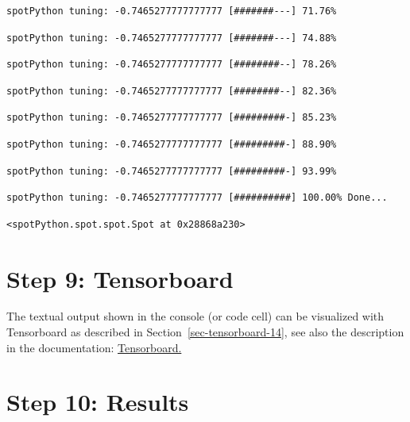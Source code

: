 \documentclass[
  letterpaper,
  DIV=11,
  numbers=noendperiod]{scrreprt}
\begin{document}
\begin{verbatim}
spotPython tuning: -0.7465277777777777 [#######---] 71.76% 
\end{verbatim}

\begin{verbatim}
spotPython tuning: -0.7465277777777777 [#######---] 74.88% 
\end{verbatim}

\begin{verbatim}
spotPython tuning: -0.7465277777777777 [########--] 78.26% 
\end{verbatim}

\begin{verbatim}
spotPython tuning: -0.7465277777777777 [########--] 82.36% 
\end{verbatim}

\begin{verbatim}
spotPython tuning: -0.7465277777777777 [#########-] 85.23% 
\end{verbatim}

\begin{verbatim}
spotPython tuning: -0.7465277777777777 [#########-] 88.90% 
\end{verbatim}

\begin{verbatim}
spotPython tuning: -0.7465277777777777 [#########-] 93.99% 
\end{verbatim}

\begin{verbatim}
spotPython tuning: -0.7465277777777777 [##########] 100.00% Done...
\end{verbatim}

\begin{verbatim}
<spotPython.spot.spot.Spot at 0x28868a230>
\end{verbatim}

\hypertarget{sec-tensorboard-19}{%
\section{Step 9: Tensorboard}\label{sec-tensorboard-19}}

The textual output shown in the console (or code cell) can be visualized
with Tensorboard as described in Section~\ref{sec-tensorboard-14}, see
also the description in the documentation:
\href{https://sequential-parameter-optimization.github.io/spotPython/14_spot_ray_hpt_torch_cifar10.html\#sec-tensorboard-14}{Tensorboard.}

\hypertarget{sec-results-tuning-19}{%
\section{Step 10: Results}\label{sec-results-tuning-19}}
\end{document}
